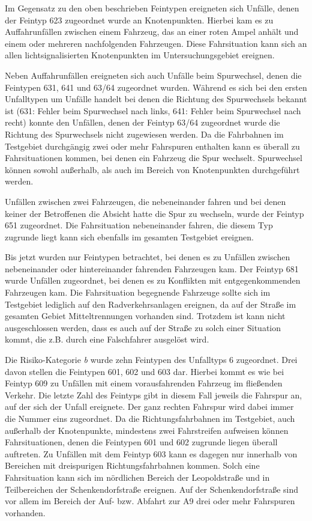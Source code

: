 Im Gegensatz zu den oben beschrieben Feintypen ereigneten sich Unfälle, denen der Feintyp 623 zugeordnet wurde an Knotenpunkten. Hierbei kam es zu Auffahrunfällen zwischen einem Fahrzeug, das an einer roten Ampel anhält und einem oder mehreren nachfolgenden Fahrzeugen. Diese Fahrsituation kann sich an allen lichtsignalisierten Knotenpunkten im Untersuchungsgebiet ereignen.

Neben Auffahrunfällen ereigneten sich auch Unfälle beim Spurwechsel, denen die Feintypen 631, 641 und 63/64 zugeordnet wurden. Während es sich bei den ersten Unfalltypen um Unfälle handelt bei denen die Richtung des Spurwechsels bekannt ist (631: Fehler beim Spurwechsel nach links, 641: Fehler beim Spurwechsel nach recht) konnte den Unfällen, denen der Feintyp 63/64 zugeordnet wurde die Richtung des Spurwechsels nicht zugewiesen werden. Da die Fahrbahnen im Testgebiet durchgängig zwei oder mehr Fahrspuren enthalten kann es überall zu Fahrsituationen kommen, bei denen ein Fahrzeug die Spur wechselt. Spurwechsel können sowohl außerhalb, als auch im Bereich von Knotenpunkten durchgeführt werden.

Unfällen zwischen zwei Fahrzeugen, die nebeneinander fahren und bei denen keiner der Betroffenen die Absicht hatte die Spur zu wechseln, wurde der Feintyp 651 zugeordnet. Die Fahrsituation nebeneinander fahren, die diesem Typ zugrunde liegt kann sich ebenfalls im gesamten Testgebiet ereignen.

Bis jetzt wurden nur Feintypen betrachtet, bei denen es zu Unfällen zwischen nebeneinander oder hintereinander fahrenden Fahrzeugen kam. Der Feintyp 681 wurde Unfällen zugeordnet, bei denen es zu Konflikten mit entgegenkommenden Fahrzeugen kam. Die Fahrsituation begegnende Fahrzeuge sollte sich im Testgebiet lediglich auf den Radverkehrsanlagen ereignen, da auf der Straße im gesamten Gebiet Mitteltrennungen vorhanden sind. Trotzdem ist kann nicht ausgeschlossen werden, dass es auch auf der Straße zu solch einer Situation kommt, die z.B. durch eine Falschfahrer ausgelöst wird.

Die Risiko-Kategorie \textit{b} wurde zehn Feintypen des Unfalltyps 6 zugeordnet. Drei davon stellen die Feintypen 601, 602 und 603 dar. Hierbei kommt es wie bei Feintyp 609 zu Unfällen mit einem vorausfahrenden Fahrzeug im fließenden Verkehr. Die letzte Zahl des Feintyps gibt in diesem Fall jeweils die Fahrspur an, auf der sich der Unfall ereignete. Der ganz rechten Fahrspur wird dabei immer die Nummer eins zugeordnet. Da die Richtungsfahrbahnen im Testgebiet, auch außerhalb der Knotenpunkte, mindestens zwei Fahrstreifen aufweisen können Fahrsituationen, denen die Feintypen 601 und 602 zugrunde liegen überall auftreten. Zu Unfällen mit dem Feintyp 603 kann es dagegen nur innerhalb von Bereichen mit dreispurigen Richtungsfahrbahnen kommen. Solch eine Fahrsituation kann sich im nördlichen Bereich der Leopoldstraße und in Teilbereichen der Schenkendorfstraße ereignen. Auf der Schenkendorfstraße sind vor allem im Bereich der Auf- bzw. Abfahrt zur A9 drei oder mehr Fahrspuren vorhanden.

